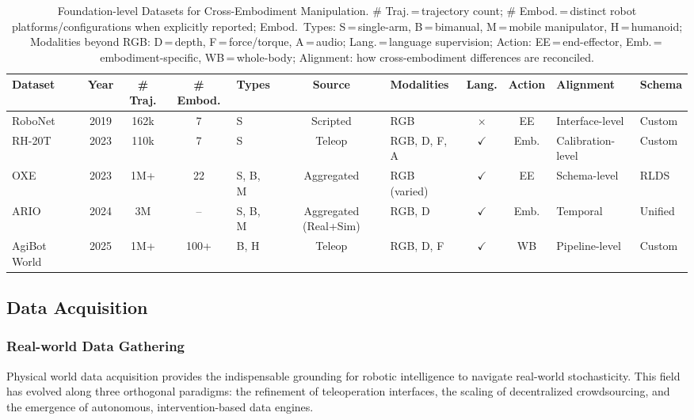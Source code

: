 \documentclass[acmsmall,screen,review,anonymous]{acmart}
\begin{document}
\begin{table}[t!]
\centering
\caption{Foundation-level Datasets for Cross-Embodiment Manipulation.
\# Traj.\,=\,trajectory count;
\# Embod.\,=\,distinct robot platforms/configurations when explicitly reported;
Embod.\ Types: S\,=\,single-arm, B\,=\,bimanual, M\,=\,mobile manipulator, H\,=\,humanoid;
Modalities beyond RGB: D\,=\,depth, F\,=\,force/torque, A\,=\,audio;
Lang.\,=\,language supervision;
Action: EE\,=\,end-effector, Emb.\,=\,embodiment-specific, WB\,=\,whole-body;
Alignment: how cross-embodiment differences are reconciled.}
\label{tab:foundation_datasets}
\renewcommand{\arraystretch}{1.15}
\setlength{\tabcolsep}{2.5pt}
\scriptsize
\begin{tabular}{lccclclccll}
\toprule
\textbf{Dataset} & \textbf{Year} & \textbf{\# Traj.} & \textbf{\# Embod.} & \textbf{Types} & \textbf{Source} & \textbf{Modalities} & \textbf{Lang.} & \textbf{Action} & \textbf{Alignment} & \textbf{Schema} \\
\midrule
RoboNet~\cite{dasari2020robonet} & 2019 & 162k & 7 & S & Scripted & RGB & $\times$ & EE & Interface-level & Custom \\
RH-20T~\cite{fang2023rh} & 2023 & 110k & 7 & S & Teleop & RGB, D, F, A & $\checkmark$ & Emb. & Calibration-level & Custom \\
OXE~\cite{padalkar2023open} & 2023 & 1M+ & 22 & S, B, M & Aggregated & RGB (varied) & $\checkmark$ & EE & Schema-level & RLDS \\
ARIO~\cite{wang2024ario} & 2024 & 3M & -- & S, B, M & Aggregated (Real+Sim) & RGB, D & $\checkmark$ & Emb. & Temporal & Unified \\
AgiBot World~\cite{agibot2025} & 2025 & 1M+ & 100+ & B, H & Teleop & RGB, D, F & $\checkmark$ & WB & Pipeline-level & Custom \\
\bottomrule
\end{tabular}
\end{table}

\subsection{Data Acquisition}\label{sec:data_acquisition}

\subsubsection{Real-world Data Gathering}\label{sec:real_acquisition}

Physical world data acquisition provides the indispensable grounding for robotic intelligence to navigate real-world stochasticity. This field has evolved along three orthogonal paradigms: the refinement of teleoperation interfaces, the scaling of decentralized crowdsourcing, and the emergence of autonomous, intervention-based data engines.
\end{document}
